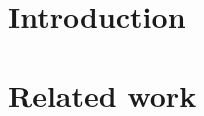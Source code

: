 \documentclass[final,1p,times]{elsarticle}
\begin{document}
\section{Introduction}
\label{sec:introduction}

\section{Related work}
\label{sec:related}
\end{document}
